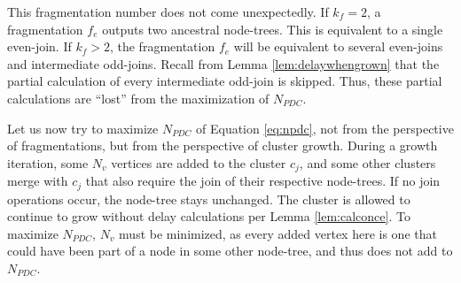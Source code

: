 This fragmentation number does not come unexpectedly. If $k_f=2$, a fragmentation $f_e$ outputs two ancestral node-trees. This is equivalent to a single even-join. If $k_f>2$, the fragmentation $f_e$ will be equivalent to several even-joins and intermediate odd-joins. Recall from Lemma \ref{lem:delaywhengrown} that the partial calculation of every intermediate odd-join is skipped. Thus, these partial calculations are ``lost'' from the maximization of $N_{PDC}$. 

Let us now try to maximize $N_{PDC}$ of Equation \eqref{eq:npdc}, not from the perspective of fragmentations, but from the perspective of cluster growth. During a growth iteration, some $N_v$ vertices are added to the cluster $c_j$, and some other clusters merge with $c_j$ that also require the join of their respective node-trees. If no join operations occur, the node-tree stays unchanged. The cluster is allowed to continue to grow without delay calculations per Lemma \ref{lem:calconce}. To maximize $N_{PDC}$, $N_v$ must be minimized, as every added vertex here is one that could have been part of a node in some other node-tree, and thus does not add to $N_{PDC}$. 

